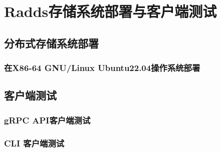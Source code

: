 \section{Radds存储系统部署与客户端测试}

	\subsection{分布式存储系统部署}
	\subsubsection{在X86-64 GNU/Linux Ubuntu22.04操作系统部署}

	
	
	\subsection{客户端测试}
	
	\subsubsection{gRPC API客户端测试}
 	\subsubsection{CLI 客户端测试}


	
\clearpage